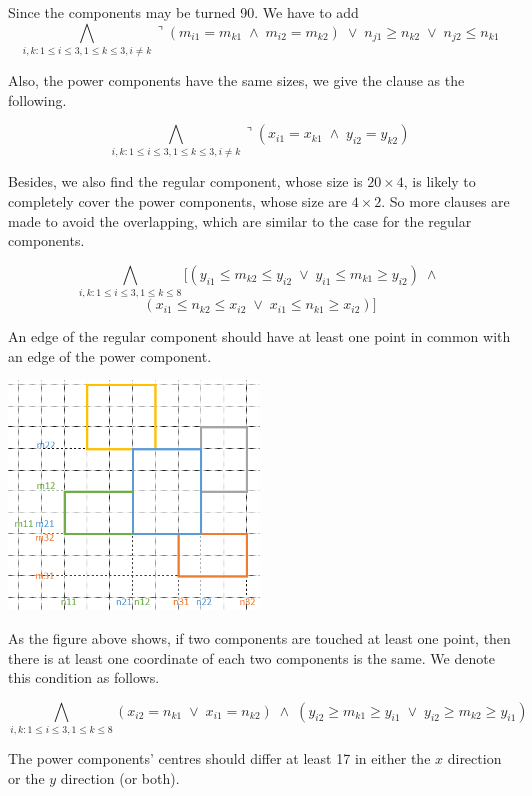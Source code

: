 \documentclass[11pt]{article}
\begin{document}
{\begin{description}
  Since the components may be turned 90. We have to add
  \[  \bigwedge_{i,k: 1 \leq i \leq 3, 1 \leq k \leq 3, i \neq k}
  \urcorner (m_{i1} = m_{k1} \; \wedge \; m_{i2} = m_{k2}) \; \vee \; n_{j1} \geq n_{k2} \; \vee \; n_{j2} \leq n_{k1} \]

  Also, the power components have the same sizes, we give the clause as the following.

  \[  \bigwedge_{i,k: 1 \leq i \leq 3, 1 \leq k \leq 3, i \neq k} \urcorner (x_{i1} = x_{k1} \; \wedge \; y_{i2} = y_{k2}) \]

  Besides, we also find the regular component, whose size is $20 \times 4$, is likely to completely cover the power components, whose size are $4 \times 2$.
  So more clauses are made to avoid the overlapping, which are similar to the case for the regular components.

  \[  \bigwedge_{i,k: 1 \leq i \leq 3, 1 \leq k \leq 8}
  [ (y_{i1} \leq m_{k2} \leq y_{i2} \; \vee \; y_{i1} \leq m_{k1} \geq y_{i2}) \; \wedge \; \]
  \[ (x_{i1} \leq n_{k2} \leq x_{i2} \; \vee \; x_{i1} \leq n_{k1} \geq x_{i2}) ] \]

  \item[Constraint 4:] An edge of the regular component should have at least one point in common with an edge of the power component.

\begin{center}
\includegraphics[width=0.5\textwidth]{Part1_2_2.png}
\end{center}

  As the figure above shows, if two components are touched at least one point, then there is at least one coordinate of each two components is the same.
  We denote this condition as follows.

  \[  \bigwedge_{i,k: 1 \leq i \leq 3, 1 \leq k \leq 8}
  (x_{i2} = n_{k1} \; \vee \; x_{i1} = n_{k2}) \; \wedge \;
  (y_{i2} \geq m_{k1} \geq y_{i1} \; \vee \; y_{i2} \geq m_{k2} \geq y_{i1}) \]
  \item[Constraint 5:] The power components' centres should differ at least 17 in either the $x$ direction or the $y$ direction (or both).


\end{description}}
\end{document}
